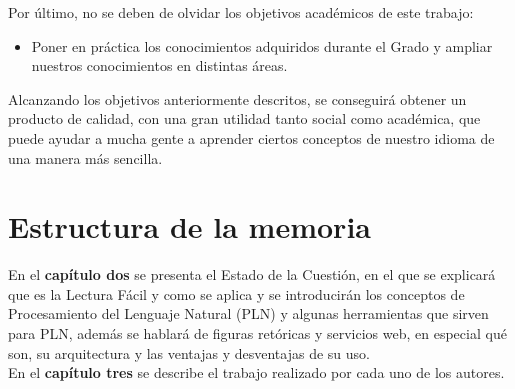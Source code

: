 Por último, no se deben de olvidar los objetivos académicos de este trabajo:
\begin{itemize}
	\item Poner en práctica los conocimientos adquiridos durante el Grado y ampliar nuestros conocimientos en distintas áreas.

	
\end{itemize}

Alcanzando los objetivos anteriormente descritos, se conseguirá obtener un producto de calidad, con una gran utilidad tanto social como académica, que puede ayudar a mucha gente a aprender ciertos conceptos de nuestro idioma de una manera más sencilla.
	
	
\section{Estructura de la memoria}
\label{cap:sec:estructuramemoria}


En el \textbf{capítulo dos} se presenta el Estado de la Cuestión, en el que se explicará que es la Lectura Fácil y como se aplica y se introducirán los conceptos de Procesamiento del Lenguaje Natural (PLN) y algunas herramientas que sirven para PLN, además se hablará de figuras retóricas y servicios web, en especial qué son, su arquitectura y las ventajas y desventajas de su uso.\\


En el \textbf{capítulo tres} se describe el trabajo realizado por cada uno de los autores.
